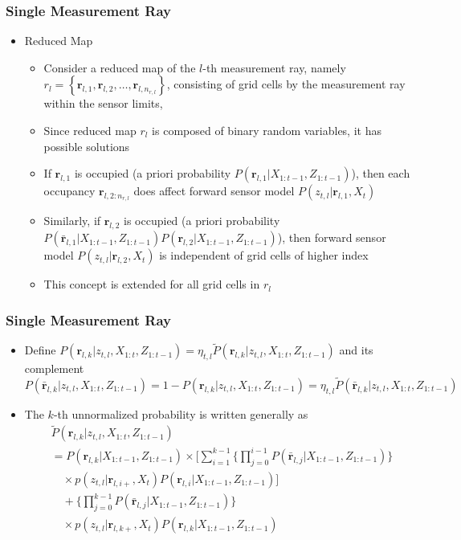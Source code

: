 \documentclass[11pt,professionalfonts,hyperref={pdftex,pdfpagemode=none,pdfstartview=FitH}]{beamer}
\newcommand{\braces}[1]{\ensuremath{\left\{ #1 \right\}}}
\renewcommand{\emph}[1]{\textit{\textbf{\color{blue}{#1}}}}
\begin{document}
\begin{frame}
\frametitle{Single Measurement Ray}

\begin{itemize}
    \item Reduced Map
	\begin{itemize}
		\item Consider a reduced map of the $l$-th measurement ray, namely $r_l=\braces{\mathbf{r}_{l,1},\mathbf{r}_{l,2},\ldots,\mathbf{r}_{l,n_{r,l}}}$, consisting of grid cells \emph{intersected} by the measurement ray within the sensor limits, \emph{indexed by increasing distance}
		\item Since reduced map $r_l$ is composed of binary random variables, it has \emph{$2^{n_{r,l}}$} possible solutions
		\item If $\mathbf{r}_{l,1}$ is occupied (a priori probability $P(\mathbf{r}_{l,1}|X_{1:t-1},Z_{1:t-1})$), then each occupancy $\mathbf{r}_{l,2:n_{r,l}}$ does \emph{not} affect forward sensor model $P(z_{t,l}|\mathbf{r}_{l,1},X_t)$
		\item Similarly, if $\mathbf{r}_{l,2}$ is occupied (a priori probability $P(\bar{\mathbf{r}}_{l,1}|X_{1:t-1},Z_{1:t-1})P(\mathbf{r}_{l,2}|X_{1:t-1},Z_{1:t-1})$), then forward sensor model $P(z_{t,l}|\mathbf{r}_{l,2},X_t)$ is independent of grid cells of higher index
		\item This concept is extended for all grid cells in $r_l$
	\end{itemize}
\end{itemize}
\end{frame}

\begin{frame}
\frametitle{Single Measurement Ray}

\begin{itemize}
	\item Define $P(\mathbf{r}_{l,k}|z_{t,l},X_{1:t},Z_{1:t-1})=\eta_{t,l}\tilde P(\mathbf{r}_{l,k}|z_{t,l},X_{1:t},Z_{1:t-1})$ and its complement $P(\bar{\mathbf{r}}_{l,k}|z_{t,l},X_{1:t},Z_{1:t-1})=1-P(\mathbf{r}_{l,k}|z_{t,l},X_{1:t},Z_{1:t-1})=\eta_{t,l}\tilde P(\bar{\mathbf{r}}_{l,k}|z_{t,l},X_{1:t},Z_{1:t-1})$
	\item The $k$-th unnormalized probability is written generally as
	\begin{align*}
		& \tilde P(\mathbf{r}_{l,k}|z_{t,l},X_{1:t},Z_{1:t-1})\nonumber\\
		&=P(\mathbf{r}_{l,k}|X_{1:t-1},Z_{1:t-1})\nonumber\times 
		\bigg[\sum_{i=1}^{k-1}\bigg\{\prod_{j=0}^{i-1}P(\bar{\mathbf{r}}_{l,j}|X_{1:t-1},Z_{1:t-1})\bigg\}\nonumber\\
		&\quad\times p(z_{t,l}|\mathbf{r}_{l,i+},X_t)P(\mathbf{r}_{l,i}|X_{1:t-1},Z_{1:t-1})\bigg]\nonumber\\
		&\quad + \bigg\{\prod_{j=0}^{k-1}P(\bar{\mathbf{r}}_{l,j}|X_{1:t-1},Z_{1:t-1})\bigg\}\nonumber\\
		&\quad\times p(z_{t,l}|\mathbf{r}_{l,k+},X_t)P(\mathbf{r}_{l,k}|X_{1:t-1},Z_{1:t-1})
	\end{align*}
\end{itemize}
\end{frame}
\end{document}
